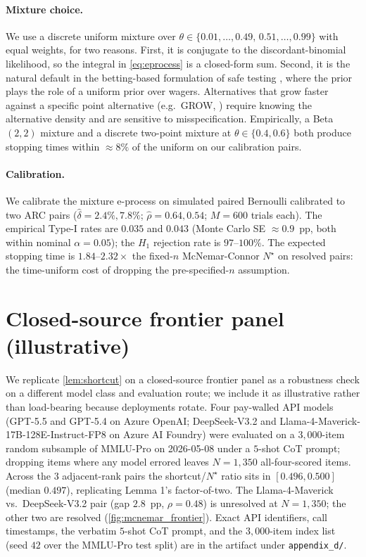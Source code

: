 \documentclass{article}
\theoremstyle{plain}
\theoremstyle{definition}
\begin{document}
\paragraph{Mixture choice.} We use a discrete uniform mixture over $\theta \in \{0.01,\ldots,0.49,\,0.51,\ldots,0.99\}$ with equal weights, for two reasons. First, it is conjugate to the discordant-binomial likelihood, so the integral in \cref{eq:eprocess} is a closed-form sum. Second, it is the natural default in the betting-based formulation of safe testing \citep{waudby2024betting}, where the prior plays the role of a uniform prior over wagers. Alternatives that grow faster against a specific point alternative (e.g.\ GROW, \citealp{grunwald2024safe}) require knowing the alternative density and are sensitive to misspecification. Empirically, a Beta$(2,2)$ mixture and a discrete two-point mixture at $\theta \in \{0.4, 0.6\}$ both produce stopping times within ${\approx}8\%$ of the uniform on our calibration pairs.

\paragraph{Calibration.} We calibrate the mixture e-process on simulated paired Bernoulli calibrated to two ARC pairs ($\hat\delta=2.4\%, 7.8\%$; $\hat\rho=0.64, 0.54$; $M{=}600$ trials each). The empirical Type-I rates are $0.035$ and $0.043$ (Monte Carlo SE ${\approx}0.9$~pp, both within nominal $\alpha{=}0.05$); the $H_1$ rejection rate is $97$--$100\%$. The expected stopping time is $1.84$--$2.32{\times}$ the fixed-$n$ McNemar-Connor $N^{\star}$ on resolved pairs: the time-uniform cost of dropping the pre-specified-$n$ assumption.

\section{Closed-source frontier panel (illustrative)}
\label{app:frontier}

We replicate \cref{lem:shortcut} on a closed-source frontier panel as a robustness check on a different model class and evaluation route; we include it as illustrative rather than load-bearing because deployments rotate. Four pay-walled API models (GPT-5.5 and GPT-5.4 on Azure OpenAI; DeepSeek-V3.2 and Llama-4-Maverick-17B-128E-Instruct-FP8 on Azure AI Foundry) were evaluated on a $3{,}000$-item random subsample of MMLU-Pro on 2026-05-08 under a $5$-shot CoT prompt; dropping items where any model errored leaves $N{=}1{,}350$ all-four-scored items. Across the $3$ adjacent-rank pairs the shortcut/$N^{\star}$ ratio sits in $[0.496, 0.500]$ (median $0.497$), replicating Lemma 1's factor-of-two. The Llama-4-Maverick vs.\ DeepSeek-V3.2 pair (gap $2.8$~pp, $\rho=0.48$) is unresolved at $N{=}1{,}350$; the other two are resolved (\cref{fig:mcnemar_frontier}). Exact API identifiers, call timestamps, the verbatim $5$-shot CoT prompt, and the $3{,}000$-item index list (seed $42$ over the MMLU-Pro test split) are in the artifact under \texttt{appendix\_d/}.
\end{document}
